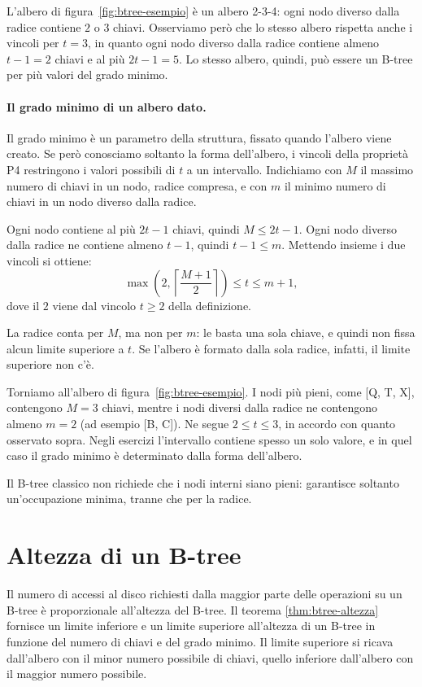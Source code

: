 L'albero di figura~\ref{fig:btree-esempio} è un albero 2-3-4: ogni nodo diverso dalla radice contiene $2$ o $3$ chiavi. Osserviamo però che lo stesso albero rispetta anche i vincoli per $t = 3$, in quanto ogni nodo diverso dalla radice contiene almeno $t - 1 = 2$ chiavi e al più $2t - 1 = 5$. Lo stesso albero, quindi, può essere un B-tree per più valori del grado minimo.

\paragraph{Il grado minimo di un albero dato.}\label{par:btree-grado-forma}
Il grado minimo è un parametro della struttura, fissato quando l'albero viene creato. Se però conosciamo soltanto la forma dell'albero, i vincoli della proprietà P4 restringono i valori possibili di $t$ a un intervallo. Indichiamo con $M$ il massimo numero di chiavi in un nodo, radice compresa, e con $m$ il minimo numero di chiavi in un nodo diverso dalla radice.

Ogni nodo contiene al più $2t-1$ chiavi, quindi $M \le 2t-1$. Ogni nodo diverso dalla radice ne contiene almeno $t-1$, quindi $t-1 \le m$. Mettendo insieme i due vincoli si ottiene:
\[
\max\left(2, \left\lceil \frac{M+1}{2} \right\rceil\right) \le t \le m+1,
\]
dove il $2$ viene dal vincolo $t \ge 2$ della definizione.

La radice conta per $M$, ma non per $m$: le basta una sola chiave, e quindi non fissa alcun limite superiore a $t$. Se l'albero è formato dalla sola radice, infatti, il limite superiore non c'è.

Torniamo all'albero di figura~\ref{fig:btree-esempio}. I nodi più pieni, come [Q, T, X], contengono $M = 3$ chiavi, mentre i nodi diversi dalla radice ne contengono almeno $m = 2$ (ad esempio [B, C]). Ne segue $2 \le t \le 3$, in accordo con quanto osservato sopra. Negli esercizi l'intervallo contiene spesso un solo valore, e in quel caso il grado minimo è determinato dalla forma dell'albero.

\begin{osservazione}
Il B-tree classico non richiede che i nodi interni siano pieni: garantisce soltanto un'occupazione minima, tranne che per la radice.
\end{osservazione}

\section{Altezza di un B-tree}\label{sec:btree-altezza}
Il numero di accessi al disco richiesti dalla maggior parte delle operazioni su un B-tree è proporzionale all'altezza del B-tree. Il teorema \ref{thm:btree-altezza} fornisce un limite inferiore e un limite superiore all'altezza di un B-tree in funzione del numero di chiavi e del grado minimo. Il limite superiore si ricava dall'albero con il minor numero possibile di chiavi, quello inferiore dall'albero con il maggior numero possibile.


